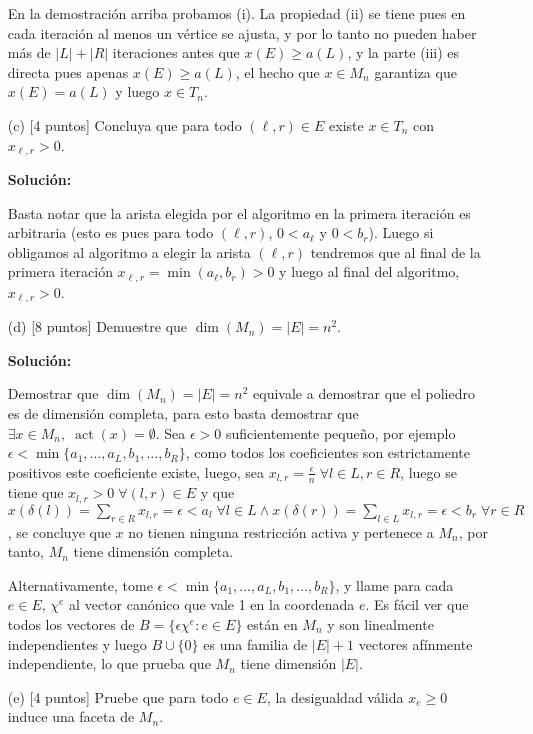 \documentclass{article}
\DeclareMathOperator{\act}{act}
\theoremstyle{plain}
\theoremstyle{definition}
\theoremstyle{Azul}
\begin{document}
\begin{enumerate}
En la demostración arriba probamos (i). La propiedad (ii) se tiene pues en cada iteración al menos un vértice se ajusta, y por lo tanto no pueden haber más de $|L|+|R|$ iteraciones antes que $x(E)\geq a(L)$, y la parte (iii) es directa pues apenas $x(E)\geq a(L)$, el hecho que $x\in M_n$ garantiza que $x(E)=a(L)$ y luego $x\in T_n$.

\item[(c)]  [4 puntos] Concluya que para todo $(\ell,r)\in E$ existe $x\in T_n$ con $x_{\ell,r}>0$.

\textbf{Solución:}

Basta notar que la arista elegida por el algoritmo en la primera iteración es arbitraria (esto es pues para todo $(\ell,r)$, $0<a_\ell$ y $0<b_r$). Luego si obligamos al algoritmo a elegir la arista $(\ell,r)$ tendremos que al final de la primera iteración $x_{\ell,r}=\min(a_\ell,b_r)>0$ y luego al final del algoritmo, $x_{\ell,r}>0$.

\item[(d)] [8 puntos] Demuestre que $\dim(M_n)=|E|=n^2$.

\textbf{Solución:}

Demostrar que $\dim(M_n)=|E|=n^{2}$ equivale a demostrar que el poliedro es de dimensión completa, para esto basta demostrar que $\exists x\in M_{n}, \; \act(x)=\emptyset$. Sea $\epsilon > 0$ suficientemente pequeño, por ejemplo $\epsilon<\min\{a_{1}, \ldots, a_{L}, b_{1}, \ldots, b_{R}\}$, como todos los coeficientes son estrictamente positivos este coeficiente existe, luego, sea $x_{l,r}=\frac{\epsilon}{n} \;\forall l \in L, r \in R$, luego se tiene que $x_{l,r}>0 \;\forall (l,r) \in E$ y que $x(\delta(l))=\sum_{r\in R}x_{l,r}=\epsilon<a_{l} \; \forall l\in L \wedge x(\delta(r))=\sum_{l\in L}x_{l,r}=\epsilon<b_{r} \; \forall r\in R$, se concluye que $x$ no tienen ninguna restricción activa y pertenece a $M_n$, por tanto, $M_{n}$ tiene dimensión completa.

Alternativamente, tome $\epsilon<\min\{a_{1}, \ldots, a_{L}, b_{1}, \ldots, b_{R}\}$, y llame para cada $e\in E$, $\chi^e$ al vector canónico que vale 1 en la coordenada $e$. Es fácil ver que todos los vectores de $B=\{\epsilon \chi^e\colon e\in E\}$ están en $M_n$ y son linealmente independientes y luego $B\cup \{0\}$ es una familia de $|E|+1$ vectores afínmente independiente, lo que prueba que $M_n$ tiene dimensión $|E|$.

\item[(e)] [4 puntos] Pruebe que para todo $e\in E$, la desigualdad válida $x_e\geq 0$ induce una faceta de $M_n$.


\end{enumerate}
\end{document}
